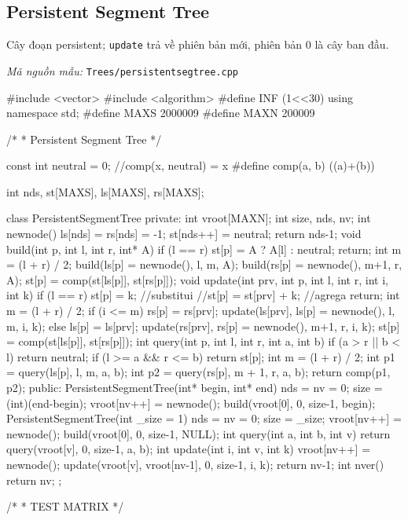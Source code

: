 \documentclass[11pt]{article}
\newcommand{\codepath}[1]{\par\noindent\textit{Mã nguồn mẫu:} \texttt{#1}\par}
\begin{document}
\subsection{Persistent Segment Tree}

Cây đoạn persistent; \texttt{update} trả về phiên bản mới, phiên bản 0 là cây ban đầu.

\codepath{Trees/persistentsegtree.cpp}

\begingroup\scriptsize
\begin{vncode}
#include <vector>
#include <algorithm>
#define INF (1<<30)
using namespace std;
#define MAXS 2000009
#define MAXN 200009

/*
 * Persistent Segment Tree
 */

const int neutral = 0; //comp(x, neutral) = x
#define comp(a, b) ((a)+(b))

int nds, st[MAXS], ls[MAXS], rs[MAXS];

class PersistentSegmentTree {
private:
	int vroot[MAXN];
	int size, nds, nv;
	int newnode() {
		ls[nds] = rs[nds] = -1;
		st[nds++] = neutral;
		return nds-1;
	}
	void build(int p, int l, int r, int* A) {
		if (l == r) {
			st[p] = A ? A[l] : neutral;
			return;
		}
		int m = (l + r) / 2;
		build(ls[p] = newnode(), l, m, A);
		build(rs[p] = newnode(), m+1, r, A);
		st[p] = comp(st[ls[p]], st[rs[p]]);
	}
	void update(int prv, int p, int l, int r, int i, int k) {
		if (l == r) {
			st[p] = k; //substitui
			//st[p] = st[prv] + k; //agrega
			return;
		}
		int m = (l + r) / 2;
		if (i <= m) {
			rs[p] = rs[prv];
			update(ls[prv], ls[p] = newnode(), l, m, i, k);
		}
		else {
			ls[p] = ls[prv];
			update(rs[prv], rs[p] = newnode(), m+1, r, i, k);
		}
		st[p] = comp(st[ls[p]], st[rs[p]]);
	}
	int query(int p, int l, int r, int a, int b) {
		if (a > r || b < l) return neutral;
		if (l >= a && r <= b) return st[p];
		int m = (l + r) / 2;
		int p1 = query(ls[p], l, m, a, b);
		int p2 = query(rs[p], m + 1, r, a, b);
		return comp(p1, p2);
	}
public:
	PersistentSegmentTree(int* begin, int* end) {
		nds = nv = 0; size = (int)(end-begin);
		vroot[nv++] = newnode();
		build(vroot[0], 0, size-1, begin);
	}
	PersistentSegmentTree(int _size = 1) {
		nds = nv = 0; size = _size;
		vroot[nv++] = newnode();
		build(vroot[0], 0, size-1, NULL);
	}
	int query(int a, int b, int v) {
		return query(vroot[v], 0, size-1, a, b);
	}
	int update(int i, int v, int k) {
		vroot[nv++] = newnode();
		update(vroot[v], vroot[nv-1], 0, size-1, i, k);
		return nv-1;
	}
	int nver() { return nv; }
};

/*
 * TEST MATRIX
 */


\end{vncode}
\end{document}
